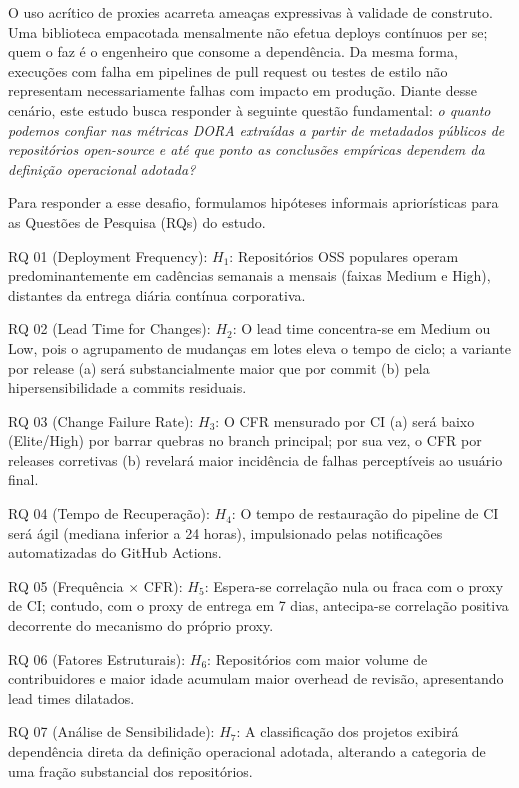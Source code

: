 \documentclass[12pt]{article}
\begin{document}
O uso acrítico de proxies acarreta ameaças expressivas à validade de construto. Uma biblioteca empacotada mensalmente não efetua deploys contínuos per se; quem o faz é o engenheiro que consome a dependência. Da mesma forma, execuções com falha em pipelines de pull request ou testes de estilo não representam necessariamente falhas com impacto em produção. Diante desse cenário, este estudo busca responder à seguinte questão fundamental: \textit{o quanto podemos confiar nas métricas DORA extraídas a partir de metadados públicos de repositórios open-source e até que ponto as conclusões empíricas dependem da definição operacional adotada?}

Para responder a esse desafio, formulamos hipóteses informais apriorísticas para as Questões de Pesquisa (RQs) do estudo.

RQ 01 (Deployment Frequency): $H_{1}$: Repositórios OSS populares operam predominantemente em cadências semanais a mensais (faixas Medium e High), distantes da entrega diária contínua corporativa.

RQ 02 (Lead Time for Changes): $H_{2}$: O lead time concentra-se em Medium ou Low, pois o agrupamento de mudanças em lotes eleva o tempo de ciclo; a variante por release (a) será substancialmente maior que por commit (b) pela hipersensibilidade a commits residuais.

RQ 03 (Change Failure Rate): $H_{3}$: O CFR mensurado por CI (a) será baixo (Elite/High) por barrar quebras no branch principal; por sua vez, o CFR por releases corretivas (b) revelará maior incidência de falhas perceptíveis ao usuário final.

RQ 04 (Tempo de Recuperação): $H_{4}$: O tempo de restauração do pipeline de CI será ágil (mediana inferior a 24 horas), impulsionado pelas notificações automatizadas do GitHub Actions.

RQ 05 (Frequência $\times$ CFR): $H_{5}$: Espera-se correlação nula ou fraca com o proxy de CI; contudo, com o proxy de entrega em 7 dias, antecipa-se correlação positiva decorrente do mecanismo do próprio proxy.

RQ 06 (Fatores Estruturais): $H_{6}$: Repositórios com maior volume de contribuidores e maior idade acumulam maior overhead de revisão, apresentando lead times dilatados.

RQ 07 (Análise de Sensibilidade): $H_{7}$: A classificação dos projetos exibirá dependência direta da definição operacional adotada, alterando a categoria de uma fração substancial dos repositórios.
\end{document}
